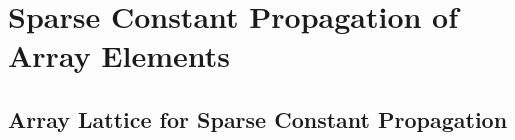 

\section{Sparse Constant Propagation of Array Elements}\label{sec:cp}
\subsection{Array Lattice for Sparse Constant Propagation }
\label{sec:arraylattice}



